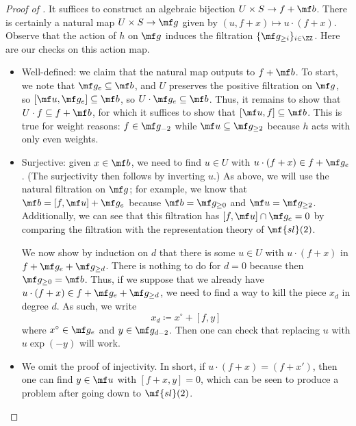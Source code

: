 \documentclass[../notes.tex]{subfiles}
\begin{document}
\begin{proof}[Proof of ]
	It suffices to construct an algebraic bijection $U\times S\to f+\mf b$. There is certainly a natural map $U\times S\to\mf g$ given by $(u,f+x)\mapsto u\cdot(f+x)$. Observe that the action of $h$ on $\mf g$ induces the filtration $\{\mf g_{\ge i}\}_{i\in\ZZ}$. Here are our checks on this action map.
	\begin{itemize}
		\item Well-defined: we claim that the natural map outputs to $f+\mf b$. To start, we note that $\mf g_e\subseteq\mf b$, and $U$ preserves the positive filtration on $\mf g$, so $[\mf u,\mf g_e]\subseteq\mf b$, so $U\cdot\mf g_e\subseteq\mf b$. Thus, it remains to show that $U\cdot f\subseteq f+\mf b$, for which it suffices to show that $[\mf u,f]\subseteq\mf b$. This is true for weight reasons: $f\in\mf g_{-2}$ while $\mf u\subseteq\mf g_{\ge2}$ because $h$ acts with only even weights.

		\item Surjective: given $x\in\mf b$, we need to find $u\in U$ with $u\cdot(f+x)\in f+\mf g_e$. (The surjectivity then follows by inverting $u$.) As above, we will use the natural filtration on $\mf g$; for example, we know that $\mf b=[f,\mf u]+\mf g_e$ because $\mf b=\mf g_{\ge0}$ and $\mf u=\mf g_{\ge2}$. Additionally, we can see that this filtration has $[f,\mf u]\cap\mf g_e=0$ by comparing the filtration with the representation theory of $\mf{sl}(2)$.

		We now show by induction on $d$ that there is some $u\in U$ with $u\cdot(f+x)$ in $f+\mf g_e+\mf g_{\ge d}$. There is nothing to do for $d=0$ because then $\mf g_{\ge0}=\mf b$. Thus, if we suppose that we already have $u\cdot(f+x)\in f+\mf g_e+\mf g_{\ge d}$, we need to find a way to kill the piece $x_d$ in degree $d$. As such, we write
		\[x_d\coloneqq x^\circ+[f,y]\]
		where $x^\circ\in\mf g_e$ and $y\in\mf g_{d-2}$. Then one can check that replacing $u$ with $u\exp(-y)$ will work.

		\item We omit the proof of injectivity. In short, if $u\cdot(f+x)=(f+x')$, then one can find $y\in\mf u$ with $[f+x,y]=0$, which can be seen to produce a problem after going down to $\mf{sl}(2)$.
		\qedhere
	\end{itemize}
\end{proof}
\end{document}
